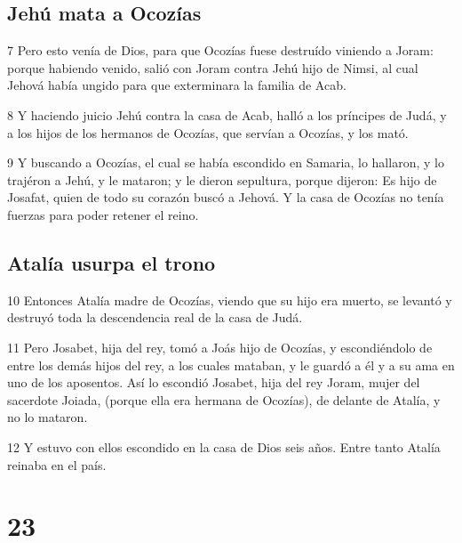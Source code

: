 \section*{Jehú mata a Ocozías}

\par 7  Pero esto venía de Dios, para que Ocozías fuese destruído viniendo a Joram: porque habiendo venido, salió con Joram contra Jehú hijo de Nimsi, al cual Jehová había ungido para que exterminara la familia de Acab.
\par 8 Y haciendo juicio Jehú contra la casa de Acab, halló a los príncipes de Judá, y a los hijos de los hermanos de Ocozías, que servían a Ocozías, y los mató.
\par 9 Y buscando a Ocozías, el cual se había escondido en Samaria, lo hallaron, y lo trajéron a Jehú, y le mataron; y le dieron sepultura, porque dijeron: Es hijo de Josafat, quien de todo su corazón buscó a Jehová. Y la casa de Ocozías no tenía fuerzas para poder retener el reino.

\section*{Atalía usurpa el trono}

\par 10 Entonces Atalía madre de Ocozías, viendo que su hijo era muerto, se levantó y destruyó toda la descendencia real de la casa de Judá.
\par 11 Pero Josabet, hija del rey, tomó a Joás hijo de Ocozías, y escondiéndolo de entre los demás hijos del rey, a los cuales mataban, y le guardó a él y a su ama en uno de los aposentos. Así lo escondió Josabet, hija del rey Joram, mujer del sacerdote Joiada, (porque ella era hermana de Ocozías), de delante de Atalía, y no lo mataron.
\par 12 Y estuvo con ellos escondido en la casa de Dios seis años. Entre tanto Atalía reinaba en el país.

\chapter{23}

